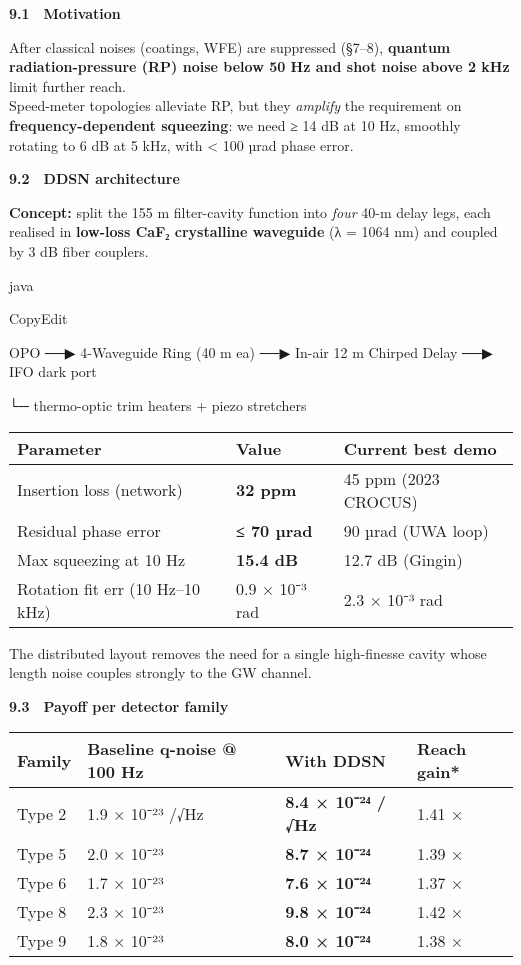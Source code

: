 \documentclass[]{article}
\begin{document}
\textbf{9.1 Motivation}

After classical noises (coatings, WFE) are suppressed (§7--8),
\textbf{quantum radiation-pressure (RP) noise below 50 Hz and shot noise
above 2 kHz} limit further reach.\\
Speed-meter topologies alleviate RP, but they \emph{amplify} the
requirement on \textbf{frequency-dependent squeezing}: we need ≥ 14 dB
at 10 Hz, smoothly rotating to 6 dB at 5 kHz, with \textless{} 100 µrad
phase error.

\textbf{9.2 DDSN architecture}

\textbf{Concept:} split the 155 m filter-cavity function into
\emph{four} 40-m delay legs, each realised in \textbf{low-loss CaF₂
crystalline waveguide} (λ = 1064 nm) and coupled by 3 dB fiber couplers.

java

CopyEdit

OPO ──▶ 4-Waveguide Ring (40 m ea) ──▶ In-air 12 m Chirped Delay ──▶ IFO
dark port

\textbar{} \textbar{} \textbar{}

└─ thermo-optic trim heaters + piezo stretchers

\begin{longtable}[]{@{}lll@{}}
\toprule
\textbf{Parameter} & \textbf{Value} & \textbf{Current best
demo}\tabularnewline
\midrule
\endhead
Insertion loss (network) & \textbf{32 ppm} & 45 ppm (2023
CROCUS)\tabularnewline
Residual phase error & \textbf{≤ 70 µrad} & 90 µrad (UWA
loop)\tabularnewline
Max squeezing at 10 Hz & \textbf{15.4 dB} & 12.7 dB
(Gingin)\tabularnewline
Rotation fit err (10 Hz--10 kHz) & 0.9 × 10⁻³ rad & 2.3 × 10⁻³
rad\tabularnewline
\bottomrule
\end{longtable}

The distributed layout removes the need for a single high-finesse cavity
whose length noise couples strongly to the GW channel.

\textbf{9.3 Payoff per detector family}

\begin{longtable}[]{@{}llll@{}}
\toprule
\textbf{Family} & \textbf{Baseline q-noise @ 100 Hz} & \textbf{With
DDSN} & \textbf{Reach gain*}\tabularnewline
\midrule
\endhead
Type 2 & 1.9 × 10⁻²³ /√Hz & \textbf{8.4 × 10⁻²⁴ /√Hz} & 1.41
×\tabularnewline
Type 5 & 2.0 × 10⁻²³ & \textbf{8.7 × 10⁻²⁴} & 1.39 ×\tabularnewline
Type 6 & 1.7 × 10⁻²³ & \textbf{7.6 × 10⁻²⁴} & 1.37 ×\tabularnewline
Type 8 & 2.3 × 10⁻²³ & \textbf{9.8 × 10⁻²⁴} & 1.42 ×\tabularnewline
Type 9 & 1.8 × 10⁻²³ & \textbf{8.0 × 10⁻²⁴} & 1.38 ×\tabularnewline
\bottomrule
\end{longtable}
\end{document}
